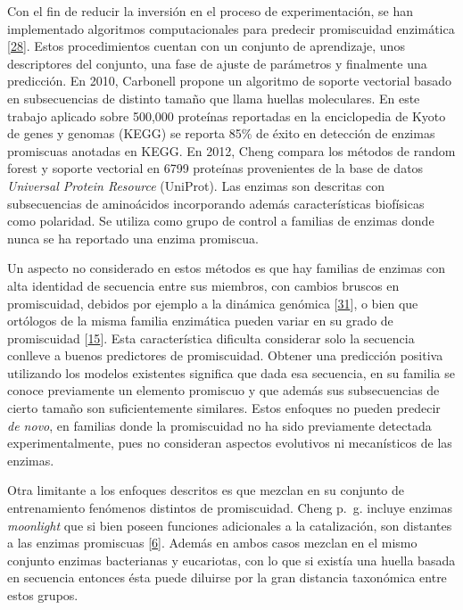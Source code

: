 \documentclass[12pt,twoside]{reedthesis}
\begin{document}
  Con el fin de reducir la inversión en el proceso de experimentación, se
  han implementado algoritmos computacionales para predecir promiscuidad
  enzimática {[}\protect\hyperlink{ref-carbonell_molecular_2010}{28}{]}.
  Estos procedimientos cuentan con un conjunto de aprendizaje, unos
  descriptores del conjunto, una fase de ajuste de parámetros y finalmente
  una predicción. En 2010, Carbonell propone un algoritmo de soporte
  vectorial basado en subsecuencias de distinto tamaño que llama huellas
  moleculares. En este trabajo aplicado sobre 500,000 proteínas reportadas
  en la enciclopedia de Kyoto de genes y genomas (KEGG) se reporta 85\% de
  éxito en detección de enzimas promiscuas anotadas en KEGG. En 2012,
  Cheng compara los métodos de random forest y soporte vectorial en 6799
  proteínas provenientes de la base de datos \emph{Universal Protein
  Resource} (UniProt). Las enzimas son descritas con subsecuencias de
  aminoácidos incorporando además características biofísicas como
  polaridad. Se utiliza como grupo de control a familias de enzimas donde
  nunca se ha reportado una enzima promiscua.
  
  Un aspecto no considerado en estos métodos es que hay familias de
  enzimas con alta identidad de secuencia entre sus miembros, con cambios
  bruscos en promiscuidad, debidos por ejemplo a la dinámica genómica
  {[}\protect\hyperlink{ref-noda-garcia_evolution_2013}{31}{]}, o bien que
  ortólogos de la misma familia enzimática pueden variar en su grado de
  promiscuidad {[}\protect\hyperlink{ref-bloom_neutral_2007}{15}{]}. Esta
  característica dificulta considerar solo la secuencia conlleve a buenos
  predictores de promiscuidad. Obtener una predicción positiva utilizando
  los modelos existentes significa que dada esa secuencia, en su familia
  se conoce previamente un elemento promiscuo y que además sus
  subsecuencias de cierto tamaño son suficientemente similares. Estos
  enfoques no pueden predecir \emph{de novo}, en familias donde la
  promiscuidad no ha sido previamente detectada experimentalmente, pues no
  consideran aspectos evolutivos ni mecanísticos de las enzimas.
  
  Otra limitante a los enfoques descritos es que mezclan en su conjunto de
  entrenamiento fenómenos distintos de promiscuidad. Cheng p.~g. incluye
  enzimas \emph{moonlight} que si bien poseen funciones adicionales a la
  catalización, son distantes a las enzimas promiscuas
  {[}\protect\hyperlink{ref-copley_enzymes_2003}{6}{]}. Además en ambos
  casos mezclan en el mismo conjunto enzimas bacterianas y eucariotas, con
  lo que si existía una huella basada en secuencia entonces ésta puede
  diluirse por la gran distancia taxonómica entre estos grupos.
  
\end{document}
